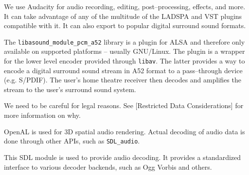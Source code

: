 

\startitemize[4]

We use Audacity for audio recording, editing, post--processing, effects, and more. It can take advantage of any of the multitude of the LADSPA and VST plugins compatible with it. It can also export to popular digital surround sound formats.


The {\tt libasound_module_pcm_a52} library is a plugin for ALSA and therefore only available on supported platforms  -- usually GNU/Linux. The plugin is a wrapper for the lower level encoder provided through {\tt libav}. The latter provides a way to encode a digital surround sound stream in A52 format to a pass--through device (e.g. S/PDIF). The user's home theatre receiver then decodes and amplifies the stream to the user's surround sound system.

We need to be careful for legal reasons. See [Restricted Data Considerations] for more information on why.




OpenAL is used for 3D spatial audio rendering. Actual decoding of audio data is done through other APIs, such as {\tt SDL_audio}.


This SDL module is used to provide audio decoding. It provides a standardized interface to various decoder backends, such as Ogg Vorbis and others.
\stopitemize

